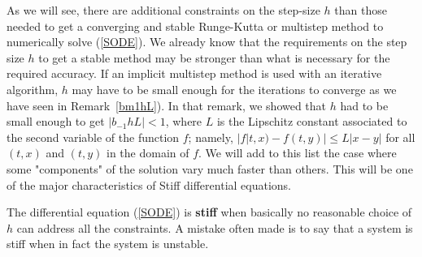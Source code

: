 As we will see, there are additional constraints on the step-size $h$
than those needed to get a converging and stable Runge-Kutta or multistep
method to numerically solve (\ref{SODE}).  We already know that
the requirements on the step size $h$ to get a stable method
may be stronger than what is necessary for the required
accuracy.  If an implicit multistep method is used with an iterative algorithm,
$h$ may have to be small enough for the iterations to converge as we have seen
in Remark~\ref{bm1hL}).  In that remark, we showed that $h$ had to be small
enough to get $|b_{-1}hL| < 1$, where $L$ is the Lipschitz constant
associated to the second variable of the function $f$; namely,
$|f|t,x)-f(t,y)| \leq L |x - y|$ for all $(t,x)$ and $(t,y)$ in the
domain of $f$.  We will add to this list the case where some "components"
of the solution vary much faster than others.  This will be one of the
major characteristics of Stiff differential equations.

The differential equation (\ref{SODE}) is
{\bfseries stiff} when
basically no reasonable choice of $h$ can address all the constraints.
A mistake often made is to say that a system is stiff when in fact the
system is unstable.

